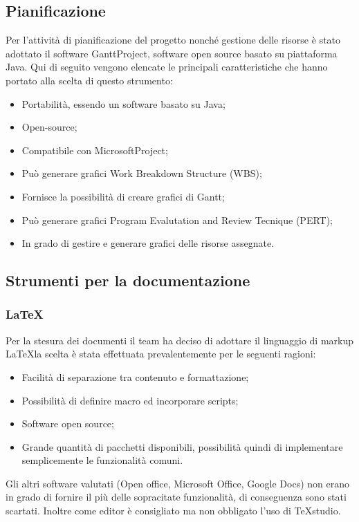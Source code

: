 \subsection{Pianificazione}

Per l'attività di pianificazione del progetto nonché gestione delle risorse è stato adottato il software GanttProject, software open source basato su piattaforma Java. Qui di seguito vengono elencate le principali caratteristiche che hanno portato alla scelta di questo strumento:
\begin{itemize}
\item Portabilità, essendo un software basato su Java;
\item Open-source;
\item Compatibile con MicrosoftProject;
\item Può generare grafici Work Breakdown Structure (WBS);
\item Fornisce la possibilità di creare grafici di Gantt;
\item Può generare grafici Program Evalutation and Review Tecnique (PERT);
\item In grado di gestire e generare grafici delle risorse assegnate.
\end{itemize}
\subsection{Strumenti per la documentazione}
\subsubsection{LaTeX}
Per la stesura dei documenti il team \gruppo{} ha deciso di adottare il linguaggio di markup \LaTeX la scelta è stata effettuata prevalentemente per le seguenti ragioni:
\begin{itemize}
\item Facilità di separazione tra contenuto
e formattazione;
\item Possibilità di definire macro ed incorporare scripts;
\item Software open source;
\item Grande quantità di pacchetti disponibili, possibilità quindi di implementare semplicemente le funzionalità comuni.
\end{itemize}
Gli altri software valutati (Open office, Microsoft Office, Google Docs) non erano in grado di fornire il più delle sopracitate funzionalità, di conseguenza sono stati scartati. Inoltre come editor è consigliato ma non obbligato l'uso di TeXstudio.

